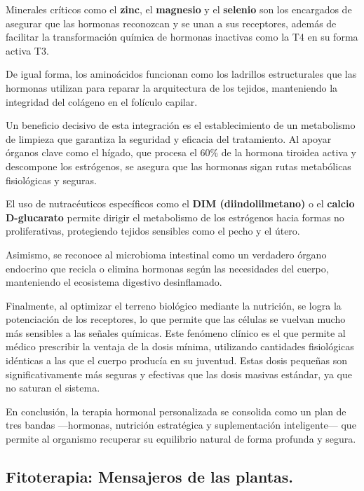 \documentclass[
  spanish,
]{article}
\begin{document}
Minerales críticos como el \textbf{zinc}, el \textbf{magnesio} y el \textbf{selenio} son los encargados de asegurar que las hormonas reconozcan y se unan a sus receptores, además de facilitar la transformación química de hormonas inactivas como la T4 en su forma activa T3.

De igual forma, los aminoácidos funcionan como los ladrillos estructurales que las hormonas utilizan para reparar la arquitectura de los tejidos, manteniendo la integridad del colágeno en el folículo capilar.

Un beneficio decisivo de esta integración es el establecimiento de un metabolismo de limpieza que garantiza la seguridad y eficacia del tratamiento. Al apoyar órganos clave como el hígado, que procesa el 60\% de la hormona tiroidea activa y descompone los estrógenos, se asegura que las hormonas sigan rutas metabólicas fisiológicas y seguras.

El uso de nutracéuticos específicos como el \textbf{DIM (diindolilmetano)} o el \textbf{calcio D-glucarato} permite dirigir el metabolismo de los estrógenos hacia formas no proliferativas, protegiendo tejidos sensibles como el pecho y el útero.

Asimismo, se reconoce al microbioma intestinal como un verdadero órgano endocrino que recicla o elimina hormonas según las necesidades del cuerpo, manteniendo el ecosistema digestivo desinflamado.

Finalmente, al optimizar el terreno biológico mediante la nutrición, se logra la potenciación de los receptores, lo que permite que las células se vuelvan mucho más sensibles a las señales químicas. Este fenómeno clínico es el que permite al médico prescribir la ventaja de la dosis mínima, utilizando cantidades fisiológicas idénticas a las que el cuerpo producía en su juventud. Estas dosis pequeñas son significativamente más seguras y efectivas que las dosis masivas estándar, ya que no saturan el sistema.

En conclusión, la terapia hormonal personalizada se consolida como un plan de tres bandas ---hormonas, nutrición estratégica y suplementación inteligente--- que permite al organismo recuperar su equilibrio natural de forma profunda y segura.

\subsection{Fitoterapia: Mensajeros de las plantas.}\label{fitoterapia-mensajeros-de-las-plantas.}
\end{document}

